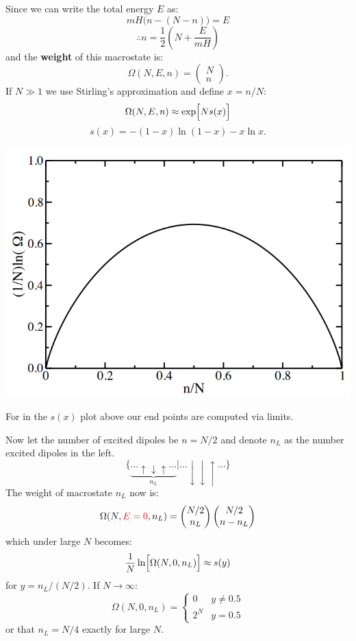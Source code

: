 \documentclass{article}
\begin{document}
\begin{multicols*}{3}
Since we can write the total energy $E$ as:
$$mH\bigl(n-(N-n)\bigr)=E$$
$$\therefore n=\frac{1}{2}\left(N+\frac{E}{mH}\right)$$
and the \textbf{weight} of this macrostate is:
$$\Omega(N,E,n)=\begin{pmatrix}
N \\ n\end{pmatrix}.$$
If $N\gg1$ we use Stirling's approximation
and define $x=n/N$: 
$$\Omega(N,E,n)\approx\exp\Bigl[N s(x)\Bigr]$$
$$s(x)=-(1-x)\ln(1-x)-x\ln x.$$
\begin{center}
    \includegraphics*[scale=0.5]{f00.png}
\end{center}
For in the $s(x)$ plot above
our end points are computed via limits.

Now let the number of excited dipoles be
$n=N/2$ and denote $n_L$ as the number excited
dipoles in the left.
$$\{\underbrace{\dots\uparrow
\downarrow\uparrow\dots}_{\text{$n_L$}}|
\dots\downarrow\downarrow\uparrow\dots\}$$
The weight of macrostate $n_L$ now is:
$$\Omega(N,\textcolor{red}{E=0},n_L)=
\begin{pmatrix}N/2 \\ n_L\end{pmatrix}
\begin{pmatrix}N/2 \\ n-n_L\end{pmatrix}$$
which under large $N$ becomes:
$$\frac{1}{N}\ln\Bigl[\Omega(N,0,n_L)\Bigr]\approx s(y)$$
for $y=n_L/(N/2)$. If $N\rightarrow\infty$:
$$\Omega(N,0,n_L)=\left\{\begin{array}{ll}
0 &y\neq0.5 \\ 2^N &y=0.5\end{array}\right.$$
or that $n_L=N/4$ exactly for large $N$.


\end{multicols*}
\end{document}
